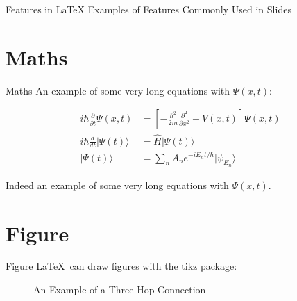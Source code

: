\documentclass{purdue-slide}
\begin{document}
\begin{titleframe}{Features in \LaTeX}
    Examples of Features Commonly Used in Slides
\end{titleframe}

\section{Maths}

\begin{frame}{Maths}
    An example of some very long equations with $\Psi (x,t)$:
    
    \begin{align}
    i\hbar {\frac {\partial }{\partial t}}\Psi (x,t)&=\left[-{\frac {\hbar ^{2}}{2m}}{\frac {\partial ^{2}}{\partial x^{2}}}+V(x,t)\right]\Psi (x,t) \\
    i\hbar {\frac {d}{dt}}\vert \Psi (t)\rangle &={\hat {H}}\vert \Psi (t)\rangle \\ 
    |\Psi (t)\rangle &=\sum _{n}A_{n}e^{{-iE_{n}t}/\hbar }|\psi _{E_{n}}\rangle
    \end{align}
    
    Indeed an example of some very long equations with $\Psi (x,t)$.
\end{frame}

\section{Figure}
\begin{frame}{Figure}
    \LaTeX\ can draw figures with the tikz package:
    \begin{figure}[h]
    \centering
    \caption{An Example of a Three-Hop Connection}
    \label{fig:three-hop}
    \end{figure}
\end{frame}
\end{document}
